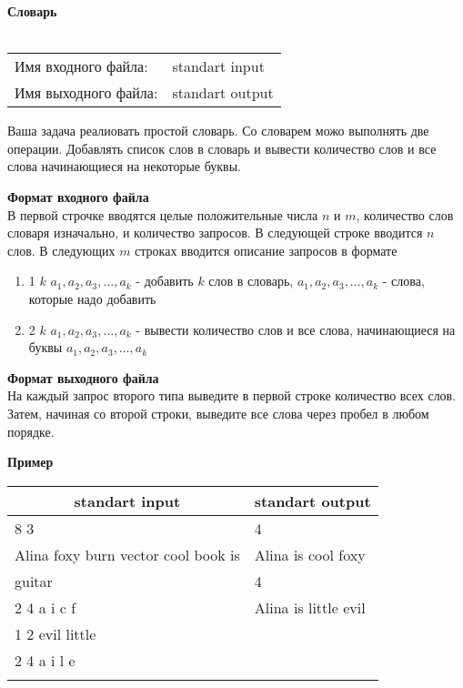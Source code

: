 \documentclass[10pt, a4paper]{article}
\begin{document}
	{\selectfont
		\noindent\LARGE\textbf{Словарь}\\\\
		\normalsize
		\begin{tabular}{ll}
			\indent Имя входного файла: & standart input\\
			\indent Имя выходного файла: & standart output\\
		\end{tabular}
		
		\noindent Ваша задача реалиовать простой словарь. Со словарем можо выполнять две операции. Добавлять список слов в словарь и вывести количество слов и все слова начинающиеся на некоторые буквы. 
		
		\noindent\large\textbf{Формат входного файла}\\
		\normalsize В первой строчке вводятся целые положительные числа $n$ и $m$, количество слов словаря изначально, и количество запросов. В следующей строке вводится $n$ слов. В следующих $m$ строках вводится описание запросов в формате 
		\begin{enumerate}
				\item 1 $k$ $a_1, a_2, a_3, \dots, a_k$ - добавить $k$ слов в словарь, $a_1, a_2, a_3, \dots, a_k$ - слова, которые надо добавить
				\item 2 $k$ $a_1, a_2, a_3, \dots, a_k$ - вывести количество слов и все слова, начинающиеся на буквы $a_1, a_2, a_3, \dots, a_k$
		\end{enumerate}
		
		\noindent\large\textbf{Формат выходного файла}\\\normalsize На каждый запрос второго типа выведите в первой строке количество всех слов. Затем, начиная со второй строки, выведите все слова через пробел в любом порядке. 
		
		\noindent\large\textbf{Пример}\normalsize
		
		\noindent\begin{tabular}{|p{5,5cm}|p{}|}
			\hline
			\multicolumn{1}{|c|}{standart input} & \multicolumn{1}{c|}{standart output}\\\hline
			8 3 & 4 \\
			Alina foxy burn vector cool book is & Alina is cool foxy  \\
			guitar & 4 \\
			2 4 a i c f & Alina is little evil\\
			1 2 evil little & \\
			2 4 a i l e & \\
			& \\\hline
		\end{tabular}
		
	}
	
\end{document}
